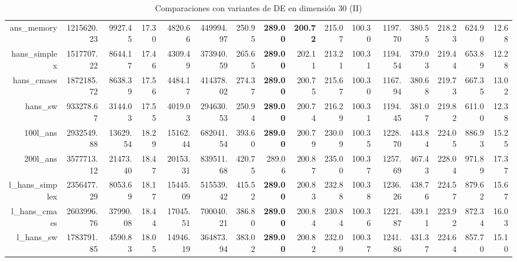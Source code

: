 \begin{table}[h!]
\begin{tabular}{rrrrrrrrrrrrrrrr}
  ans\_memory & 1215620.23 & 9927.45 & 17.30 & 4820.66 & 449994.97 & 250.95 & \textbf{289.00} & \textbf{200.72} & 215.07 & 100.30 & 1197.70 & 380.55 & 218.23 & 624.90 & 12.68 \\ 
  hans\_simplex & 1517707.22 & 8644.17 & 17.46 & 4309.49 & 373940.59 & 265.65 & \textbf{289.00} & 202.11 & 213.21 & 100.31 & 1194.54 & 379.03 & 219.44 & 653.89 & 12.28 \\ 
  hans\_cmaes & 1872185.72 & 8638.39 & 17.56 & 4484.17 & 414378.02 & 274.37 & \textbf{289.00} & 200.75 & 215.67 & 100.30 & 1167.94 & 380.68 & 219.73 & 667.35 & 13.02 \\ 
  hans\_sw & 933278.67 & 3144.03 & 17.55 & 4019.03 & 294630.53 & 250.94 & \textbf{289.00} & 200.74 & 216.29 & 100.31 & 1194.45 & 381.07 & 219.82 & 611.00 & 12.38 \\ 
  100l\_ans & 2932549.88 & 13629.54 & 18.29 & 15162.44 & 682041.54 & 393.60 & \textbf{289.00} & 200.79 & 230.09 & 100.35 & 1228.70 & 443.84 & 224.05 & 886.93 & 15.25 \\ 
  200l\_ans & 3577713.12 & 21473.40 & 18.47 & 20153.31 & 839511.68 & 420.75 & 289.06 & 200.87 & 235.00 & 100.37 & 1257.69 & 467.43 & 228.04 & 971.89 & 17.37 \\ 
  l\_hans\_simplex & 2356477.29 & 8053.69 & 18.17 & 15445.09 & 515539.42 & 415.52 & \textbf{289.00} & 200.83 & 232.88 & 100.38 & 1236.26 & 438.76 & 224.57 & 879.62 & 15.67 \\ 
  l\_hans\_cmaes & 2603996.76 & 37990.08 & 18.44 & 17045.51 & 700040.21 & 386.80 & \textbf{289.00} & 200.84 & 230.84 & 100.36 & 1221.87 & 439.11 & 223.92 & 872.34 & 16.03 \\ 
  l\_hans\_sw & 1783791.85 & 4590.83 & 18.05 & 14946.19 & 364873.94 & 383.02 & \textbf{289.00} & 200.82 & 232.09 & 100.37 & 1241.86 & 431.37 & 224.64 & 857.70 & 15.10 \\ 
   \hline
\end{tabular}
\endgroup
\caption{Comparaciones con variantes de DE en dimensión 30 (II)} 
\label{complete30b}
\end{table}
